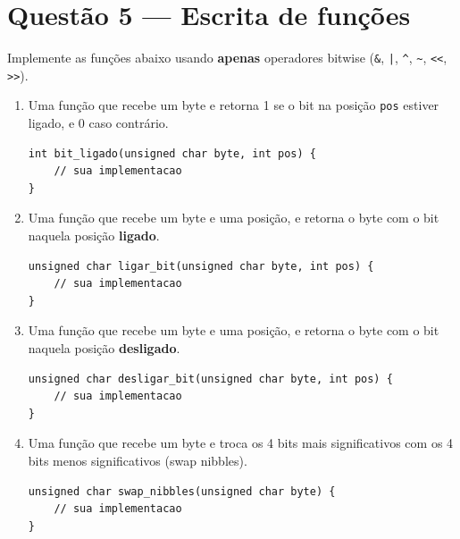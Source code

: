 \documentclass[12pt,a4paper]{article}
\begin{document}
\section{Questão 5 --- Escrita de funções}

Implemente as funções abaixo usando \textbf{apenas} operadores bitwise (\texttt{\&}, \texttt{|}, \texttt{\^{}}, \texttt{\~{}}, \texttt{<<}, \texttt{>>}).

\begin{enumerate}[label=\alph*)]
\item Uma função que recebe um byte e retorna 1 se o bit na posição \texttt{pos} estiver ligado, e 0 caso contrário.
\begin{lstlisting}[style=code]
int bit_ligado(unsigned char byte, int pos) {
    // sua implementacao
}
\end{lstlisting}

\item Uma função que recebe um byte e uma posição, e retorna o byte com o bit naquela posição \textbf{ligado}.
\begin{lstlisting}[style=code]
unsigned char ligar_bit(unsigned char byte, int pos) {
    // sua implementacao
}
\end{lstlisting}

\item Uma função que recebe um byte e uma posição, e retorna o byte com o bit naquela posição \textbf{desligado}.
\begin{lstlisting}[style=code]
unsigned char desligar_bit(unsigned char byte, int pos) {
    // sua implementacao
}
\end{lstlisting}

\item Uma função que recebe um byte e troca os 4 bits mais significativos com os 4 bits menos significativos (swap nibbles).
\begin{lstlisting}[style=code]
unsigned char swap_nibbles(unsigned char byte) {
    // sua implementacao
}
\end{lstlisting}

\end{enumerate}
\end{document}
